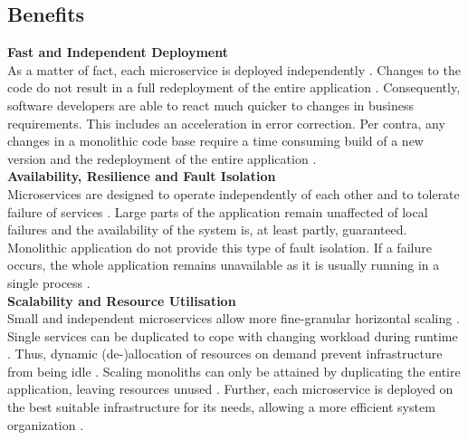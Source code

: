 \FloatBarrier

\subsection{Benefits}
\textbf{Fast and Independent Deployment} \\
As a matter of fact, each microservice is deployed independently \cite{interfaceAnalysisBaresi}. Changes to the code do not result in a full redeployment of the entire application \cite{FunctionalDecompositionHeinrich}. Consequently, software developers are able to react much quicker to changes in business requirements. This includes an acceleration in error correction. Per contra, any changes in a monolithic code base require a time consuming build of a new version and the redeployment of the entire application \cite{Fowler}. \\

\noindent
\textbf{Availability, Resilience and Fault Isolation} \\
Microservices are designed to operate independently of each other and to tolerate failure of services \cite{Fowler}. Large parts of the application remain unaffected of local failures and the availability of the system is, at least partly, guaranteed. Monolithic application do not provide this type of fault isolation. If a failure occurs, the whole application remains unavailable as it is usually running in a single process \cite{ExtractionMazlami}. \\
 
\noindent
\textbf{Scalability and Resource Utilisation} \\
Small and independent microservices allow more fine-granular horizontal scaling \cite{WorkloadbasedClustering}. Single services can be duplicated to cope with changing workload during runtime \cite{DataflowDrivenChen}. Thus, dynamic (de-)allocation of resources on demand prevent infrastructure from being idle \cite{HeuristicsAlwis}. Scaling monoliths can only be attained by duplicating the entire application, leaving resources unused \cite{ClassificationOfRefactoring}. Further, each microservice is deployed on the best suitable infrastructure for its needs, allowing a more efficient system organization \cite{infoq}. \\

